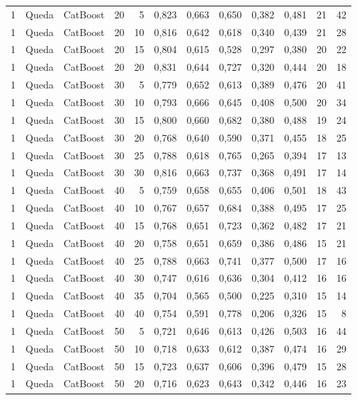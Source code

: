 \begin{longtable}{@{}rllrrrrrrrrr@{}}
1 & Queda & CatBoost & 20 & 5 & 0,823 & 0,663 & 0,650 & 0,382 & 0,481 & 21 & 42 \\
1 & Queda & CatBoost & 20 & 10 & 0,816 & 0,642 & 0,618 & 0,340 & 0,439 & 21 & 28 \\
1 & Queda & CatBoost & 20 & 15 & 0,804 & 0,615 & 0,528 & 0,297 & 0,380 & 20 & 22 \\
1 & Queda & CatBoost & 20 & 20 & 0,831 & 0,644 & 0,727 & 0,320 & 0,444 & 20 & 18 \\
1 & Queda & CatBoost & 30 & 5 & 0,779 & 0,652 & 0,613 & 0,389 & 0,476 & 20 & 41 \\
1 & Queda & CatBoost & 30 & 10 & 0,793 & 0,666 & 0,645 & 0,408 & 0,500 & 20 & 34 \\
1 & Queda & CatBoost & 30 & 15 & 0,800 & 0,660 & 0,682 & 0,380 & 0,488 & 19 & 24 \\
1 & Queda & CatBoost & 30 & 20 & 0,768 & 0,640 & 0,590 & 0,371 & 0,455 & 18 & 25 \\
1 & Queda & CatBoost & 30 & 25 & 0,788 & 0,618 & 0,765 & 0,265 & 0,394 & 17 & 13 \\
1 & Queda & CatBoost & 30 & 30 & 0,816 & 0,663 & 0,737 & 0,368 & 0,491 & 17 & 14 \\
1 & Queda & CatBoost & 40 & 5 & 0,759 & 0,658 & 0,655 & 0,406 & 0,501 & 18 & 43 \\
1 & Queda & CatBoost & 40 & 10 & 0,767 & 0,657 & 0,684 & 0,388 & 0,495 & 17 & 25 \\
1 & Queda & CatBoost & 40 & 15 & 0,768 & 0,651 & 0,723 & 0,362 & 0,482 & 17 & 21 \\
1 & Queda & CatBoost & 40 & 20 & 0,758 & 0,651 & 0,659 & 0,386 & 0,486 & 15 & 21 \\
1 & Queda & CatBoost & 40 & 25 & 0,788 & 0,663 & 0,741 & 0,377 & 0,500 & 17 & 16 \\
1 & Queda & CatBoost & 40 & 30 & 0,747 & 0,616 & 0,636 & 0,304 & 0,412 & 16 & 16 \\
1 & Queda & CatBoost & 40 & 35 & 0,704 & 0,565 & 0,500 & 0,225 & 0,310 & 15 & 14 \\
1 & Queda & CatBoost & 40 & 40 & 0,754 & 0,591 & 0,778 & 0,206 & 0,326 & 15 & 8 \\
1 & Queda & CatBoost & 50 & 5 & 0,721 & 0,646 & 0,613 & 0,426 & 0,503 & 16 & 44 \\
1 & Queda & CatBoost & 50 & 10 & 0,718 & 0,633 & 0,612 & 0,387 & 0,474 & 16 & 29 \\
1 & Queda & CatBoost & 50 & 15 & 0,723 & 0,637 & 0,606 & 0,396 & 0,479 & 15 & 28 \\
1 & Queda & CatBoost & 50 & 20 & 0,716 & 0,623 & 0,643 & 0,342 & 0,446 & 16 & 23 \\

\end{longtable}
